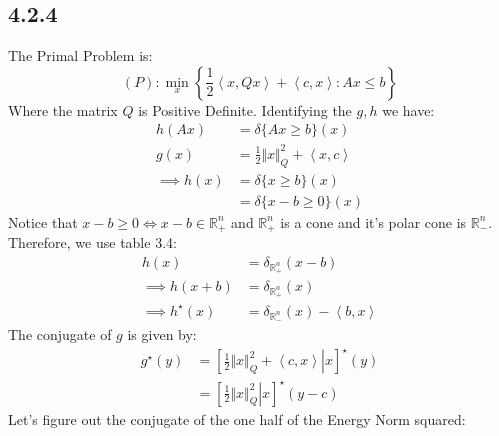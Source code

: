 \documentclass[]{article}
\begin{document}
    \subsection*{4.2.4}
        The Primal Problem is: 
        $$
            (P): \min_{x} \left\lbrace
                \frac{1}{2} \left\langle x, Qx \right\rangle + \left\langle c, x \right\rangle: Ax \le b
            \right\rbrace
        $$
        Where the matrix $Q$ is Positive Definite. Identifying the $g, h$ we have: 
        \begin{align*}\tag{4.2.4.1}\label{eqn:4.2.4.1}
            h(Ax) &= \delta \{Ax \ge b \}(x)
            \\
            g(x) &= \frac{1}{2}\Vert x\Vert_Q^2 + \left\langle x, c \right\rangle
            \\
            \implies h(x) &= 
            \delta\{x \ge b\}(x)
            \\
            &= \delta\{x - b \ge 0\}(x)
        \end{align*}
        Notice that $x - b\ge 0 \iff x - b \in \mathbb{R}_+^n$ and $\mathbb{R}_+^n$ is a cone and it's polar cone is $\mathbb{R}^n_-$. Therefore, we use table 3.4: 
        \begin{align*}\tag{4.2.4.2}\label{eqn:4.2.4.2}
            h(x) &= \delta_{\mathbb{R}_+^n}(x -b)
            \\
            \implies h(x + b) &= \delta_{\mathbb{R}_+^n}(x)
            \\
            \implies
            h^\star(x) &= \delta_{\mathbb{R}_-^n}(x) - \left\langle b, x \right\rangle
        \end{align*}
        The conjugate of $g$ is given by: 
        \begin{align*}\tag{4.2.4.3}\label{eqn:4.2.4.3}
            g^\star(y) &= 
            \left[
                \left.
                    \frac{1}{2}\Vert x\Vert_Q^2 + \left\langle c, x \right\rangle
                \right| x
            \right]^\star (y)
            \\
            &=  
            \left[
                \left.
                    \frac{1}{2}\Vert x\Vert_Q^2
                \right| x
            \right]^\star (y- c)
        \end{align*}
        Let's figure out the conjugate of the one half of the Energy Norm squared: 
\end{document}
